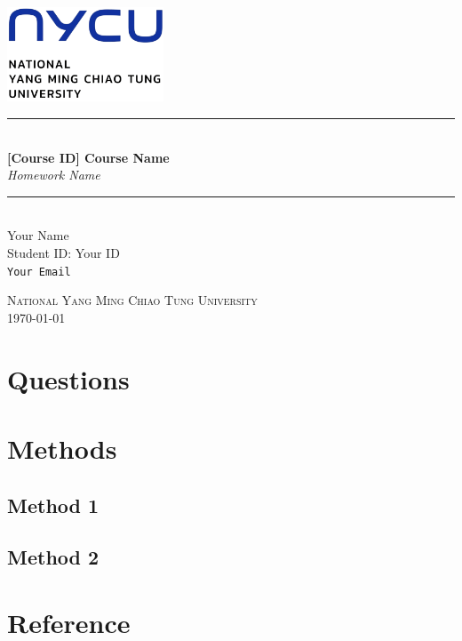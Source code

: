 \documentclass[12pt,a4paper]{article}
\newcommand{\HRule}{\rule{\linewidth}{0.5mm}}
\begin{document}
\begin{titlepage}
\begin{center}

\includegraphics[width=0.35\textwidth]{logo/en_nycu}~\\[2cm]


\HRule \\[0.4cm]
{ \LARGE 
  \textbf{[Course ID] Course Name}\\[0.4cm]
  \emph{Homework Name}\\[0.4cm]
}
\HRule \\[1.5cm]



{ \large
  Your Name \\[0.1cm]
  Student ID: Your ID\\[0.1cm]
  \texttt{Your Email}
}

\vfill

\textsc{\Large National Yang Ming Chiao Tung University}\\[0.4cm]


{\large \today}
 
\end{center}
\end{titlepage}

\tableofcontents
\newpage

\section{Questions}

\section{Methods}

\subsection{Method 1}

\subsection{Method 2}

\section{Reference}

\end{document}
